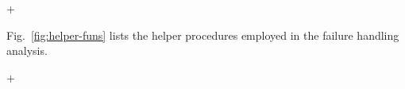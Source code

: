 






\lstDeleteShortInline+


Fig.~\ref{fig:helper-funs} lists the helper procedures employed in
the failure handling analysis.

\lstMakeShortInline[basicstyle=\scriptsize\ttfamily,keywordstyle=\color{DarkPurple},breaklines=true]+

